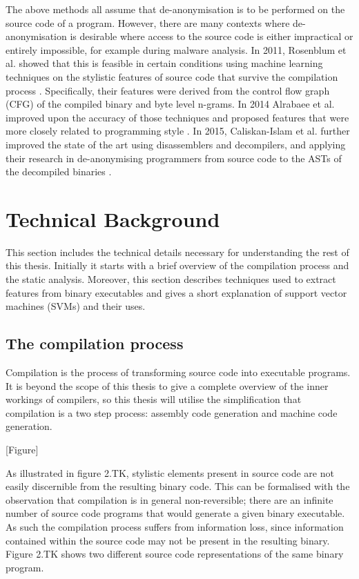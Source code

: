 \documentclass[a4paper,11pt]{kth-mag}
\begin{document}
The above methods all assume that de-anonymisation is to be performed on the
source code of a program. However, there are many contexts where
de-anonymisation is desirable where access to the source code is either
impractical or entirely impossible, for example during malware analysis. In
2011, Rosenblum et al. showed that this is feasible in certain conditions
using machine learning techniques on the stylistic features of source code that
survive the compilation process \parencite{rosenblum2011wrote}. Specifically,
their features were derived from the control flow graph (CFG) of the compiled
binary and byte level n-grams. In 2014 Alrabaee et al. improved upon the
accuracy of those techniques and proposed features that were more closely
related to programming style \parencite{alrabaee2014oba2}. In 2015,
Caliskan-Islam et al. further improved the state of the art using disassemblers
and decompilers, and applying their research in de-anonymising programmers from
source code to the ASTs of the decompiled binaries
\parencite{caliskan2015coding}.

\section{Technical Background}
This section includes the technical details necessary for understanding the
rest of this thesis. Initially it starts with a brief overview of the compilation process
and the static analysis. Moreover, this section describes techniques used to extract features from binary
executables and gives a short explanation of support vector machines (SVMs) and their
uses. 

\subsection{The compilation process}
Compilation is the process of transforming source code into executable
programs. It is beyond the scope of this thesis to give a complete overview of
the inner workings of compilers, so this thesis will utilise the simplification that
compilation is a two step process: assembly code generation and machine code
generation.

[Figure]

As illustrated in figure 2.TK, stylistic elements present in source code are
not easily discernible from the resulting binary code. This can be formalised
with the observation that compilation is in general non-reversible; there are 
an infinite number of source code programs that would generate a given binary
executable. As such the compilation process suffers from information loss,
since information contained within the source code may not be present in the
resulting binary. Figure 2.TK shows two different source code representations
of the same binary program.
\end{document}
